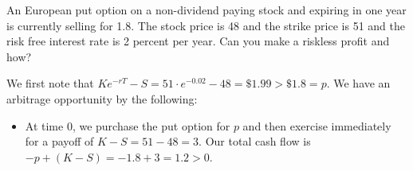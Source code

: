 \documentclass[12pt,twoside, letter]{exam}
\theoremstyle{definition}
\begin{document}
  \par{An European put option on a non-dividend paying stock and expiring in one year
    is currently selling for 1.8. The stock price is 48 and the strike price is 51
    and the risk free interest rate is 2 percent per year. Can you
    make a riskless profit and how?}
      \begin{solution}
        We first note that $Ke^{-rT} - S = 51\cdot e^{-0.02} - 48= \$ 1.99 > \$1.8 = p$. We have
        an arbitrage opportunity by the following:
        \begin{itemize}
          \item At time $0$, we purchase the put option for $p$ and then exercise immediately for a payoff of $K - S = 51 - 48 = 3$.
            Our total cash flow is $-p + (K - S) = -1.8 + 3 = 1.2 > 0$.
        \end{itemize}
      \end{solution}
\end{document}
